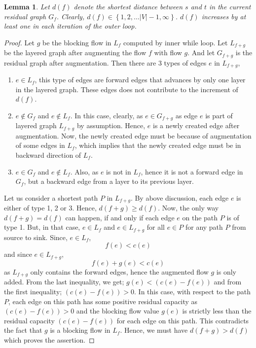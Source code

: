 \documentclass[12pt]{article}
\newtheorem{lemma}{Lemma}[section]
\begin{document}
\begin{lemma}
	Let $d(f)$ denote the shortest distance between $s$ and $t$ in the current residual graph $G_f$. Clearly, $d(f) \in \left\{1, 2, \dots |V|-1, \infty \right\}$. $d(f)$ increases by at least one in each iteration of the outer loop.
\end{lemma}
\begin{proof}
	Let $g$ be the blocking flow in $L_f$ computed by inner while loop. Let $L_{f+g}$ be the layered graph after augmenting the flow $f$ with flow $g$. And let $G_{f+g}$ is the residual graph after augmentation. Then there are 3 types of edges $e$ in $L_{f+g}$,
	\begin{enumerate}
		\item $e \in L_f$, this type of edges are forward edges that advances by only one layer in the layered graph. These edges does not contribute to the increment of $d(f)$.
		\item $e\notin G_f$ and $e\notin L_f$. In this case, clearly, as $e\in G_{f+g}$ as edge $e$ is part of layered graph $L_{f+g}$ by assumption. Hence, $e$ is a newly created edge after augmentation. Now, the newly created edge must be because of augmentation of some edges in $L_f$, which implies that the newly created edge must be in backward direction of $L_f$.
		\item $e\in G_f$ and $e\notin L_f$. Also, as $e$ is not in $L_f$, hence it is not a forward edge in $G_f$, but a backward edge from a layer to its previous layer.
	\end{enumerate}
	Let us consider a shortest path $P$ in $L_{f+g}$. By above discussion, each edge $e$ is either of type 1, 2 or 3. Hence, $d(f+g) \geq d(f)$. Now, the only way $d(f+g) = d(f)$ can happen, if and only if each edge $e$ on the path $P$ is of type 1. But, in that case, $e\in L_f$ and $e\in L_{f+g}$ for all $e\in P$ for any path $P$ from source to sink. Since, $e\in L_f$, 
	$$f(e) < c(e)$$
	and since $e\in L_{f+g}$,
	$$f(e) + g(e) < c(e)$$
	as $L_{f+g}$ only contains the forward edges, hence the augmented flow $g$ is only added. From the last inequality, we get; $g(e) < \left(c(e) - f(e)\right)$ and from the first inequality; $\left(c(e) - f(e)\right) > 0$. In this case, with respect to the path $P$, each edge on this path has some positive residual capacity as $\left(c(e) - f(e)\right) > 0$ and the blocking flow value $g(e)$ is strictly less than the residual capacity $\left(c(e) - f(e)\right)$ for each edge on this path. This contradicts the fact that $g$ is a blocking flow in $L_f$. Hence, we must have $d(f+g) > d(f)$ which proves the assertion.
\end{proof}
\end{document}
